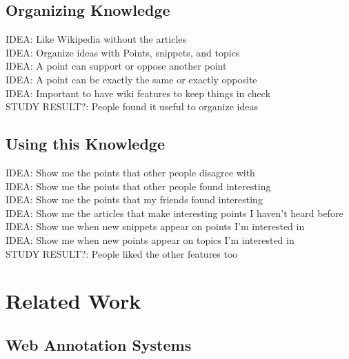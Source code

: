 \documentclass{chi2009}
\newcommand{\idea}[1]{{\color{blue} IDEA: #1}\\}
\newcommand{\studyresult}[1]{{\color{red} STUDY RESULT?: #1}\\}
\begin{document}
\subsection{Organizing Knowledge}

\idea{Like Wikipedia without the articles}

\idea{Organize ideas with Points, snippets, and topics}

\idea{A point can support or oppose another point}

\idea{A point can be exactly the same or exactly opposite}

\idea{Important to have wiki features to keep things in check}

\studyresult{People found it useful to organize ideas}




\subsection{Using this Knowledge}

\idea{Show me the points that other people disagree with}

\idea{Show me the points that other people found interesting}

\idea{Show me the points that my friends found interesting}


\idea{Show me the articles that make interesting points I haven't heard before}

\idea{Show me when new snippets appear on points I'm interested in}

\idea{Show me when new points appear on topics I'm interested in}



\studyresult{People liked the other features too}



\section{Related Work}

\subsection{Web Annotation Systems}
\end{document}
